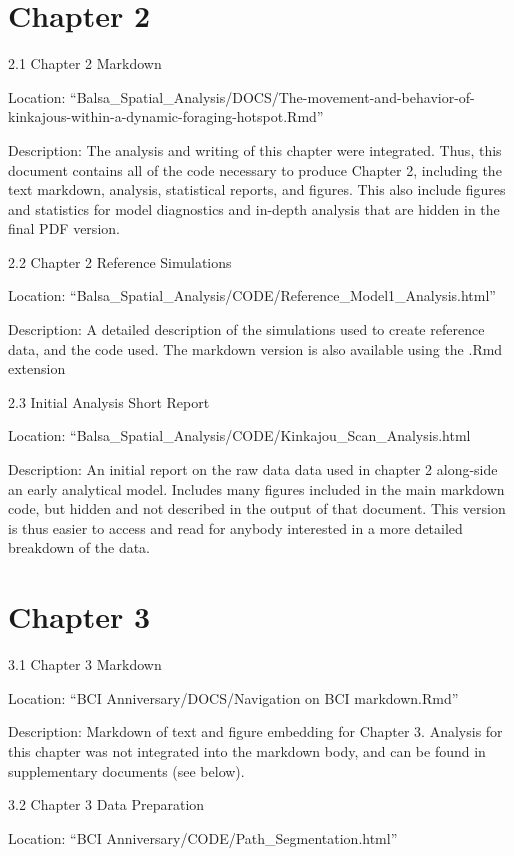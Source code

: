 \documentclass[twoside,12pt,final]{ucthesis-CA2012}
\begin{document}
\begin{ucmainmatter}
\hypertarget{chapter-2}{%
\section{Chapter 2}\label{chapter-2}}

2.1 Chapter 2 Markdown

Location: ``Balsa\_Spatial\_Analysis/DOCS/The-movement-and-behavior-of-kinkajous-within-a-dynamic-foraging-hotspot.Rmd''

Description: The analysis and writing of this chapter were integrated. Thus, this document contains all of the code necessary to produce Chapter 2, including the text markdown, analysis, statistical reports, and figures. This also include figures and statistics for model diagnostics and in-depth analysis that are hidden in the final PDF version.

2.2 Chapter 2 Reference Simulations

Location: ``Balsa\_Spatial\_Analysis/CODE/Reference\_Model1\_Analysis.html''

Description: A detailed description of the simulations used to create reference data, and the code used. The markdown version is also available using the .Rmd extension

2.3 Initial Analysis Short Report

Location: ``Balsa\_Spatial\_Analysis/CODE/Kinkajou\_Scan\_Analysis.html

Description: An initial report on the raw data data used in chapter 2 along-side an early analytical model. Includes many figures included in the main markdown code, but hidden and not described in the output of that document. This version is thus easier to access and read for anybody interested in a more detailed breakdown of the data.

\hypertarget{chapter-3}{%
\section{Chapter 3}\label{chapter-3}}

3.1 Chapter 3 Markdown

Location: ``BCI Anniversary/DOCS/Navigation on BCI markdown.Rmd''

Description: Markdown of text and figure embedding for Chapter 3. Analysis for this chapter was not integrated into the markdown body, and can be found in supplementary documents (see below).

3.2 Chapter 3 Data Preparation

Location: ``BCI Anniversary/CODE/Path\_Segmentation.html''


\end{ucmainmatter}
\end{document}
